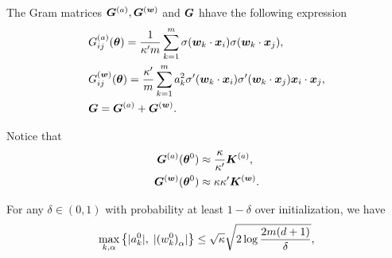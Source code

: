 \documentclass{article}
\begin{document}
\noindent The Gram matrices $\bm{G}^{(a)},\bm{G}^{(\bm{w})}$ and $\bm{G}$ hhave the following expression
\begin{equation}
    \begin{aligned}
         & G^{(a)}_{ij}(\bm{\theta})=\frac{1}{\kappa' m}\sum_{k=1}^m\sigma(\bm{w}_k\cdot\bm{x}_i)\sigma(\bm{w}_k\cdot\bm{x}_j),                        \\
         & G^{(\bm{w})}_{ij}(\bm{\theta})=\frac{\kappa'}{m}\sum_{k=1}^m a_k^2\sigma'(\bm{w}_k\cdot\bm{x}_i)\sigma'(\bm{w}_k\cdot\bm{x}_j)\bm{x}_i\cdot\bm{x}_j, \\
         & \bm{G}=\bm{G}^{(a)}+\bm{G}^{(\bm{w})}.
    \end{aligned}
\end{equation}
\begin{rmk}
    Notice that
    \begin{equation}
        \begin{aligned}
            \bm{G}^{(a)}(\bm{\theta}^0)   & \approx\frac{\kappa}{\kappa'}\bm{K}^{(a)}, \\
            \bm{G}^{(\bm{w})}(\bm{\theta}^0) & \approx\kappa\kappa'\bm{K}^{(\bm{w})}.
        \end{aligned}
    \end{equation}
\end{rmk}
\begin{lem}\label{lem1}
    For any $\delta\in(0,1)$ with probability at least $1-\delta$ over initialization, we have
    \begin{equation}\label{eqn:lem1}
        \max\limits_{k,\alpha}\left\{\lvert a_k^0\rvert,\; \lvert{(w^0_k)}_{\alpha}\rvert\right \}\leq\sqrt{\kappa}\sqrt{2\log\frac{2m(d+1)}{\delta}},
    \end{equation}
\end{lem}
\end{document}
